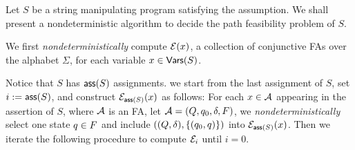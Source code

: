 
Let $S$ be a string manipulating program satisfying the \prerec{} assumption. 
We shall present a nondeterministic algorithm to decide the path feasibility problem of $S$.

We first \emph{nondeterministically} compute $\mathcal{E}(x)$, a collection of conjunctive FAs over the alphabet $\Sigma$, for each variable $x \in \mathsf{Vars}(S)$. %

  


Notice that $S$ has $\mathsf{ass}(S)$ assignments. we start from the last assignment of $S$,  set $i:=\mathsf{ass}(S)$, and construct $\mathcal{E}_{\mathsf{ass}(S)}(x)$ as follows: For each %
$x \in \mathcal{A}$ appearing in the assertion of $S$, where $\mathcal{A}$ is an FA, let $\mathcal{A} = (Q, q_0, \delta, F)$, we \emph{nondeterministically} select one state $q \in F$ and include $((Q, \delta), \{(q_0, q)\})$ into $\mathcal{E}_{\mathsf{ass}(S)}(x)$. Then we iterate the following procedure to compute $\mathcal{E}_{i}$ until $i=0$.  
%

